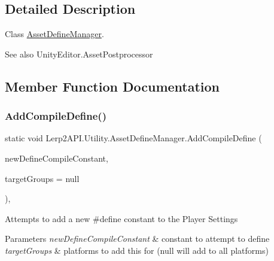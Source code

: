 \subsection{Detailed Description}
Class \hyperlink{class_lerp2_a_p_i_1_1_utility_1_1_asset_define_manager}{Asset\+Define\+Manager}. 

\begin{DoxySeeAlso}{See also}
Unity\+Editor.\+Asset\+Postprocessor


\end{DoxySeeAlso}


\subsection{Member Function Documentation}
\mbox{\label{class_lerp2_a_p_i_1_1_utility_1_1_asset_define_manager_a28688c397b8b972e446b5522e657d467}} 
\subsubsection{\texorpdfstring{Add\+Compile\+Define()}{AddCompileDefine()}}
{\footnotesize\ttfamily static void Lerp2\+A\+P\+I.\+Utility.\+Asset\+Define\+Manager.\+Add\+Compile\+Define (\begin{DoxyParamCaption}\item[{string}]{new\+Define\+Compile\+Constant,  }\item[{Build\+Target\+Group \mbox{[}$\,$\mbox{]}}]{target\+Groups = {\ttfamily null} }\end{DoxyParamCaption})\hspace{0.3cm}{\ttfamily [inline]}, {\ttfamily [static]}}



Attempts to add a new \#define constant to the Player Settings 


\begin{DoxyParams}{Parameters}
{\em new\+Define\+Compile\+Constant} & constant to attempt to define\\
\hline
{\em target\+Groups} & platforms to add this for (null will add to all platforms)\\
\hline
\end{DoxyParams}
\mbox{\label{class_lerp2_a_p_i_1_1_utility_1_1_asset_define_manager_a3a1590728fc4b737b7ef2a69701a6a3e}} 
